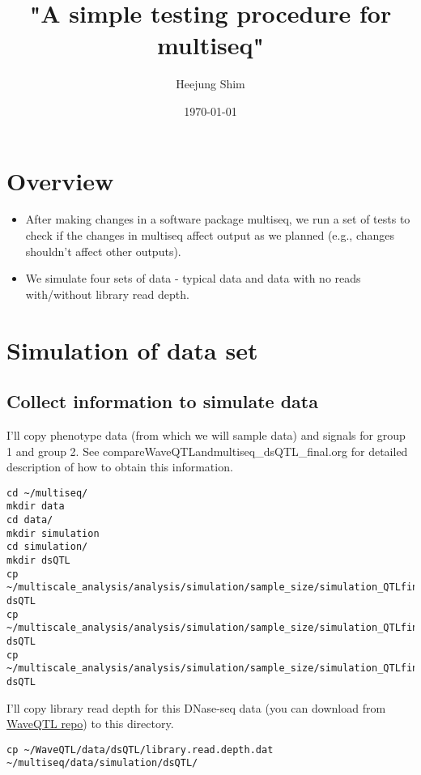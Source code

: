 \documentclass[11pt]{article}
\author{Heejung Shim}
\date{\today}
\title{"A simple testing procedure for multiseq"}
\begin{document}
\maketitle
\tableofcontents


\section{Overview}
\label{sec-1}
\begin{itemize}
\item After making changes in a software package multiseq, we run a set of tests to check if the changes in multiseq affect output as we planned (e.g., changes shouldn't affect other outputs).
\item We simulate four sets of data - typical data and data with no reads with/without library read depth.
\end{itemize}

\section{Simulation of data set}
\label{sec-2}
\subsection{Collect information to simulate data}
\label{sec-2-1}
I'll copy phenotype data (from which we will sample data) and signals for group 1 and group 2. See compareWaveQTLandmultiseq\_dsQTL\_final.org for detailed description of how to obtain this information. 
\begin{lstlisting}
cd ~/multiseq/
mkdir data
cd data/
mkdir simulation
cd simulation/
mkdir dsQTL
cp ~/multiscale_analysis/analysis/simulation/sample_size/simulation_QTLfinal_v2/data/pheno.dat dsQTL
cp ~/multiscale_analysis/analysis/simulation/sample_size/simulation_QTLfinal_v2/data/alt.sig0 dsQTL
cp ~/multiscale_analysis/analysis/simulation/sample_size/simulation_QTLfinal_v2/data/alt.sig1 dsQTL
\end{lstlisting}

I'll copy library read depth for this DNase-seq data (you can download from \href{https://github.com/heejungshim/WaveQTL/blob/master/data/dsQTL/library.read.depth.dat}{WaveQTL repo}) to this directory.  
\begin{lstlisting}
cp ~/WaveQTL/data/dsQTL/library.read.depth.dat ~/multiseq/data/simulation/dsQTL/
\end{lstlisting}
\end{document}
